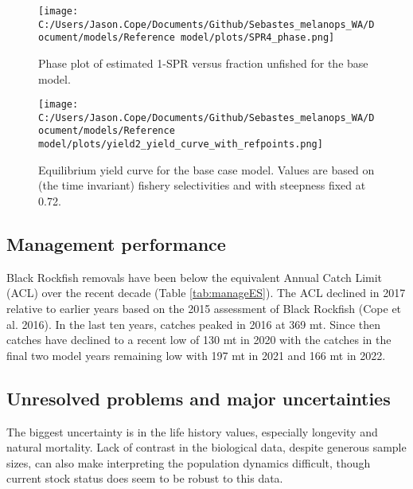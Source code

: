 \documentclass[11pt,
  english,
  letterpaper,
]{article}
\begin{document}


\begin{figure}
\centering
\texttt{[image: C:/Users/Jason.Cope/Documents/Github/Sebastes\_melanops\_WA/Document/models/Reference model/plots/SPR4\_phase.png]}
\caption{Phase plot of estimated 1-SPR versus fraction unfished for the base model.\label{fig:es-phase}}
\end{figure}

\begin{figure}
\centering
\texttt{[image: C:/Users/Jason.Cope/Documents/Github/Sebastes\_melanops\_WA/Document/models/Reference model/plots/yield2\_yield\_curve\_with\_refpoints.png]}
\caption{Equilibrium yield curve for the base case model. Values are based on (the time invariant) fishery selectivities and with steepness fixed at 0.72.\label{fig:es-yield}}
\end{figure}

\clearpage

\hypertarget{management-performance}{%
\subsection*{Management performance}\label{management-performance}}

Black Rockfish removals have been below the equivalent Annual Catch Limit (ACL) over the recent decade (Table \ref{tab:manageES}). The ACL declined in 2017 relative to earlier years based on the 2015 assessment of Black Rockfish (Cope et al. 2016). In the last ten years, catches peaked in 2016 at 369 mt. Since then catches have declined to a recent low of 130 mt in 2020 with the catches in the final two model years remaining low with 197 mt in 2021 and 166 mt in 2022.



\clearpage

\hypertarget{unresolved-problems-and-major-uncertainties}{%
\subsection*{Unresolved problems and major uncertainties}\label{unresolved-problems-and-major-uncertainties}}

The biggest uncertainty is in the life history values, especially longevity and natural mortality. Lack of contrast in the biological data, despite generous sample sizes, can also make interpreting the population dynamics difficult, though current stock status does seem to be robust to this data.
\end{document}
